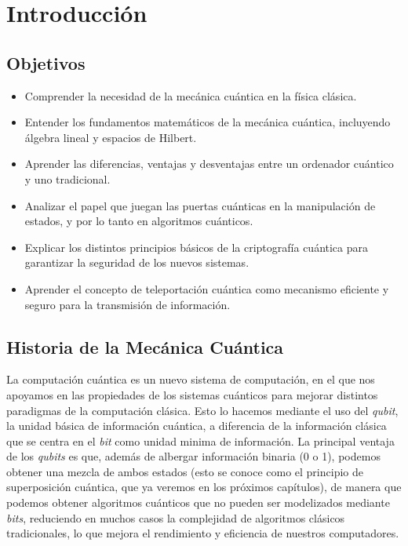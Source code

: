 \documentclass{article}
\numberwithin{equation}{section} %
\begin{document}
    \thispagestyle{empty}
    \section{Introducción}
        \subsection{Objetivos}

        \vspace{5mm}

        \begin{itemize}
            \item Comprender la necesidad de la mecánica cuántica en la física clásica.
            \item Entender los fundamentos matemáticos de la mecánica cuántica, incluyendo álgebra lineal y espacios de Hilbert.
            \item Aprender las diferencias, ventajas y desventajas entre un ordenador cuántico y uno tradicional.
            \item Analizar el papel que juegan las puertas cuánticas en la manipulación de estados, y por lo tanto en algoritmos cuánticos.
            \item Explicar los distintos principios básicos de la criptografía cuántica para garantizar la seguridad de los nuevos sistemas.
            \item Aprender el concepto de teleportación cuántica como mecanismo eficiente y seguro para la transmisión de información.
        \end{itemize}

        \vspace{5mm}

        \subsection{Historia de la Mecánica Cuántica}\label{sec: historia}

        \vspace{5mm}

        La computación cuántica es un nuevo sistema de computación, en el que nos apoyamos en las propiedades de los sistemas cuánticos para mejorar distintos paradigmas de la computación clásica. Esto lo hacemos mediante el uso del \textit{qubit}, la unidad básica de información cuántica, a diferencia de la información clásica que se centra en el \textit{bit} como unidad minima de información. La principal ventaja de los \textit{qubits} es que, además de albergar información binaria (0 o 1), podemos obtener una mezcla de ambos estados (esto se conoce como el principio de superposición cuántica, que ya veremos en los próximos capítulos), de manera que podemos obtener algoritmos cuánticos que no pueden ser modelizados mediante \textit{bits}, reduciendo en muchos casos la complejidad de algoritmos clásicos tradicionales, lo que mejora el rendimiento y eficiencia de nuestros computadores.
\end{document}
